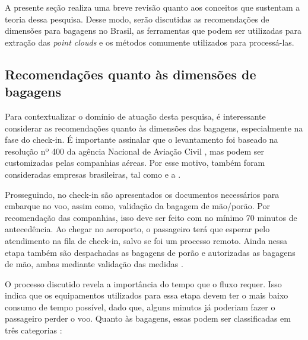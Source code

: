     A presente seção realiza uma breve revisão quanto aos conceitos que sustentam a teoria dessa pesquisa. Desse modo, serão discutidas as recomendações de dimensões para bagagens no Brasil, as ferramentas que podem ser utilizadas para extração das \textit{point clouds} e os métodos comumente utilizados para processá-las.

\subsection{Recomendações quanto às dimensões de bagagens}
\label{subsec_processo Processo de embarque}
    
    Para contextualizar o domínio de atuação desta pesquisa, é interessante considerar as recomendações quanto às dimensões das bagagens, especialmente na fase do check-in. É importante assinalar que o levantamento foi baseado na resolução nº 400 da agência Nacional de Aviação Civil \cite{anac_2022_resoluo}, mas podem ser customizadas pelas companhias aéreas. Por esse motivo, também foram consideradas empresas brasileiras, tal como  e a .
    
	Prosseguindo, no check-in são apresentados os documentos necessários para embarque no voo, assim como, validação da bagagem de mão/porão. Por recomendação das companhias, isso deve ser feito com no mínimo 70 minutos de antecedência. Ao chegar no aeroporto, o passageiro terá que esperar pelo atendimento na fila de check-in, salvo se foi um processo remoto. Ainda nessa etapa também são despachadas as bagagens de porão e autorizadas as bagagens de mão, ambas mediante validação das medidas \cite{denis_2021_bagagem, daniel_2021_como}.
	
    O processo discutido revela a importância do tempo que o fluxo requer. Isso indica que os equipamentos utilizados para essa etapa devem ter o mais baixo consumo de tempo possível, dado que, alguns minutos já poderiam fazer o passageiro perder o voo. Quanto às bagagens, essas podem ser classificadas em três categorias \cite{azul_2022_bagagem}:
    
